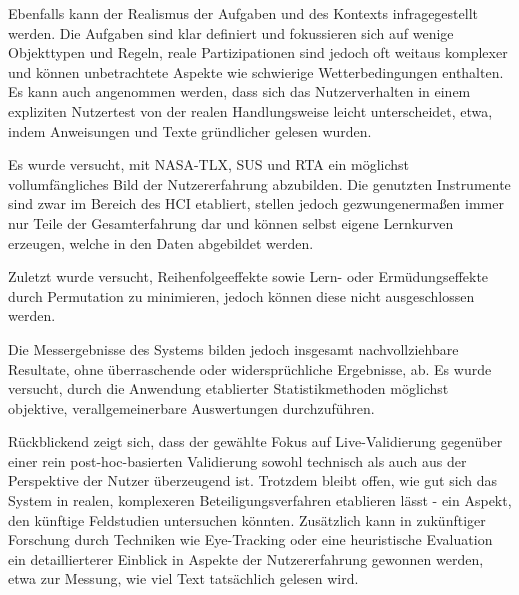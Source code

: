 Ebenfalls kann der Realismus der Aufgaben und des Kontexts infragegestellt werden. Die Aufgaben sind klar definiert und fokussieren sich auf wenige Objekttypen und Regeln, reale Partizipationen sind jedoch oft weitaus komplexer und können unbetrachtete Aspekte wie schwierige Wetterbedingungen enthalten. Es kann auch angenommen werden, dass sich das Nutzerverhalten in einem expliziten Nutzertest von der realen Handlungsweise leicht unterscheidet, etwa, indem Anweisungen und Texte gründlicher gelesen wurden.

Es wurde versucht, mit NASA-TLX, SUS und RTA ein möglichst vollumfängliches Bild der Nutzererfahrung abzubilden. Die genutzten Instrumente sind zwar im Bereich des HCI etabliert, stellen jedoch gezwungenermaßen immer nur Teile der Gesamterfahrung dar und können selbst eigene Lernkurven erzeugen, welche in den Daten abgebildet werden.

Zuletzt wurde versucht, Reihenfolgeeffekte sowie Lern- oder Ermüdungseffekte durch Permutation zu minimieren, jedoch können diese nicht ausgeschlossen werden.

\medskip

Die Messergebnisse des Systems bilden jedoch insgesamt nachvollziehbare Resultate, ohne überraschende oder widersprüchliche Ergebnisse, ab. Es wurde versucht, durch die Anwendung etablierter Statistikmethoden möglichst objektive, verallgemeinerbare Auswertungen durchzuführen.

Rückblickend zeigt sich, dass der gewählte Fokus auf Live-Validierung gegenüber einer rein post-hoc-basierten Validierung sowohl technisch als auch aus der Perspektive der Nutzer überzeugend ist. Trotzdem bleibt offen, wie gut sich das System in realen, komplexeren Beteiligungsverfahren etablieren lässt - ein Aspekt, den künftige Feldstudien untersuchen könnten. Zusätzlich kann in zukünftiger Forschung durch Techniken wie Eye-Tracking oder eine heuristische Evaluation ein detaillierterer Einblick in Aspekte der Nutzererfahrung gewonnen werden, etwa zur Messung, wie viel Text tatsächlich gelesen wird.
